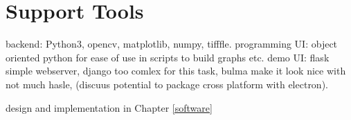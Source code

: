 \section{Support Tools}
\begin{comment}
You should also identify any support tools that you used. You should discuss your choice of implementation tools or simulation tools. For any code that you have written, you can talk about languages and related tools. For any simulation and analysis tools, identify the tools and how they are used on the project. 

For the parts of your project that need some engineering (hardware, software, firmware, or a mixture) to support the experiments, include details in your report about your design and implementation. You should discuss with your supervisor whether it is better to include a different top-level section to describe any engineering work.  In this template, Chapter 3 is suggested as a place for that discussion.
\end{comment}

backend: Python3, opencv, matplotlib, numpy, tifffle.
programming UI: object oriented python for ease of use in scripts to build graphs etc.
demo UI: flask simple webserver, django too comlex for this task, bulma make it look nice with not much hasle, (discuus potential to package cross platform with electron). 

design and implementation in Chapter \ref{software}



